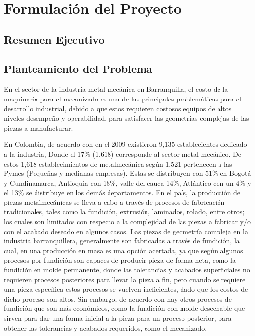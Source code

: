 \chapter{Formulación del Proyecto}
\section{Resumen Ejecutivo}
    
\newpage

\section{Planteamiento del Problema}

    En el sector de la industria metal-mecánica en Barranquilla, el costo de la maquinaria para el mecanizado es una de las principales problemáticas para el desarrollo industrial,  debido a que estos requieren costosos equipos de altos niveles desempeño y operabilidad, para satisfacer las geometrias complejas de las piezas a manufacturar.
    
   
    
    En Colombia, de acuerdo con \cite{lora2012determinantes} en el 2009 existieron 9,135 establecientes dedicado a la industria, Donde el 17\% (1,618) corresponde al sector metal mecánico. De estos 1,618 establecimientos de metalmecánica según \cite{lora2012determinantes} 1,521 pertenecen a las Pymes (Pequeñas y medianas empresas). Estas se distribuyen con 51\% en Bogotá y Cundinamarca, Antioquia con 18\%, valle del cauca 14\%, Atlántico con un 4\% y el 13\% se distribuye en los demás departamentos. En el país, la producción de piezas metalmecánicas se lleva a cabo a través de procesos de fabricación tradicionales, tales como la fundición, extrusión, laminados, rolado, entre otros; los cuales son limitados con respecto a la complejidad de las piezas a fabricar y/o con el acabado deseado en algunos casos. Las piezas de geometría compleja en la industria barranquillera, generalmente son fabricadas a través de fundición, la cual, en una producción en masa es una opción acertada, ya que según \cite{groover2007fundamentals} algunos procesos por fundición son capaces de producir pieza de forma neta, como la fundición en molde permanente, donde las tolerancias y acabados superficiales no requieren procesos posteriores para llevar la pieza a fin, pero cuando se requiere una pieza específica estos procesos se vuelven ineficientes, dado que los costos de dicho proceso son altos. Sin embargo, de acuerdo con \cite{groover2007fundamentals} hay otros procesos de fundición que son más económicos, como la fundición con molde desechable que sirven para dar una forma inicial a la pieza para un proceso posterior, para obtener las tolerancias y acabados requeridos, como el mecanizado.
    
